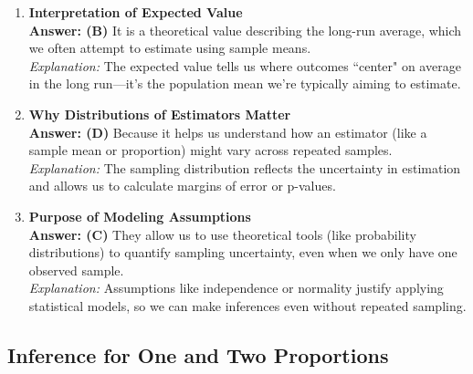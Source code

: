 \documentclass{article}
\begin{document}
\begin{enumerate}
  \item \textbf{Interpretation of Expected Value} \\
  \textbf{Answer: (B)} It is a theoretical value describing the long-run average, which we often attempt to estimate using sample means.\\
  \textit{Explanation:} The expected value tells us where outcomes ``center" on average in the long run—it’s the population mean we're typically aiming to estimate.

  \item \textbf{Why Distributions of Estimators Matter} \\
  \textbf{Answer: (D)} Because it helps us understand how an estimator (like a sample mean or proportion) might vary across repeated samples.\\
  \textit{Explanation:} The sampling distribution reflects the uncertainty in estimation and allows us to calculate margins of error or p-values.

  \item \textbf{Purpose of Modeling Assumptions} \\
  \textbf{Answer: (C)} They allow us to use theoretical tools (like probability distributions) to quantify sampling uncertainty, even when we only have one observed sample.\\
  \textit{Explanation:} Assumptions like independence or normality justify applying statistical models, so we can make inferences even without repeated sampling.
\end{enumerate}



\subsection{Inference for One and Two Proportions}
\end{document}
